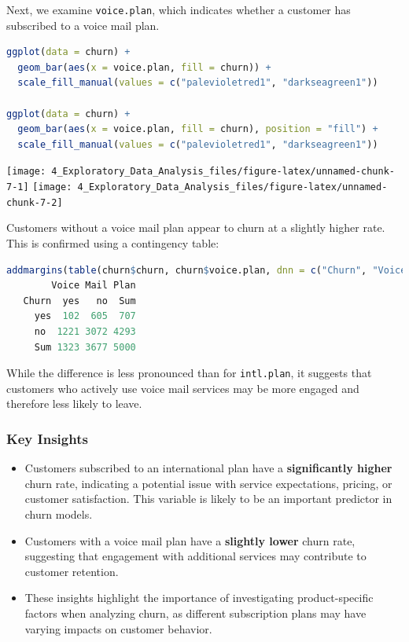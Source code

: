 \documentclass[
  11pt,
]{book}
\newcommand{\passthrough}[1]{#1}
\providecommand{\tightlist}{%
  \setlength{\itemsep}{0pt}\setlength{\parskip}{0pt}}
\theoremstyle{definition}
\theoremstyle{definition}
\theoremstyle{definition}
\theoremstyle{definition}
\theoremstyle{remark}
\begin{document}
Next, we examine \passthrough{\lstinline!voice.plan!}, which indicates whether a customer has subscribed to a voice mail plan.

\begin{lstlisting}[language=R]
ggplot(data = churn) + 
  geom_bar(aes(x = voice.plan, fill = churn)) +
  scale_fill_manual(values = c("palevioletred1", "darkseagreen1")) 

ggplot(data = churn) + 
  geom_bar(aes(x = voice.plan, fill = churn), position = "fill") +
  scale_fill_manual(values = c("palevioletred1", "darkseagreen1")) 
\end{lstlisting}

\texttt{[image: 4\_Exploratory\_Data\_Analysis\_files/figure-latex/unnamed-chunk-7-1]} \texttt{[image: 4\_Exploratory\_Data\_Analysis\_files/figure-latex/unnamed-chunk-7-2]}

Customers without a voice mail plan appear to churn at a slightly higher rate. This is confirmed using a contingency table:

\begin{lstlisting}[language=R]
addmargins(table(churn$churn, churn$voice.plan, dnn = c("Churn", "Voice Mail Plan")))
        Voice Mail Plan
   Churn  yes   no  Sum
     yes  102  605  707
     no  1221 3072 4293
     Sum 1323 3677 5000
\end{lstlisting}

While the difference is less pronounced than for \passthrough{\lstinline!intl.plan!}, it suggests that customers who actively use voice mail services may be more engaged and therefore less likely to leave.

\subsubsection*{Key Insights}\label{key-insights}


\begin{itemize}
\tightlist
\item
  Customers subscribed to an international plan have a \textbf{significantly higher} churn rate, indicating a potential issue with service expectations, pricing, or customer satisfaction. This variable is likely to be an important predictor in churn models.
\item
  Customers with a voice mail plan have a \textbf{slightly lower} churn rate, suggesting that engagement with additional services may contribute to customer retention.
\item
  These insights highlight the importance of investigating product-specific factors when analyzing churn, as different subscription plans may have varying impacts on customer behavior.
\end{itemize}
\end{document}
